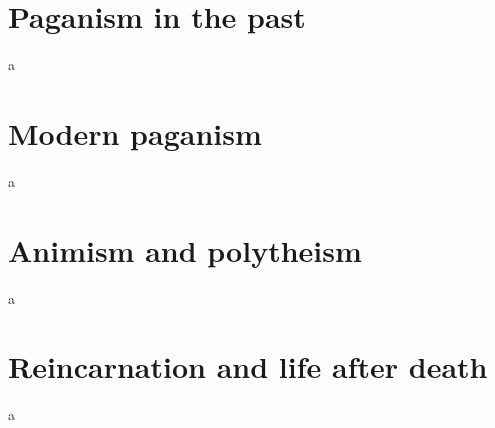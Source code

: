 \section{Paganism in the past}
a



\section{Modern paganism}
a




\section{Animism and polytheism}
a



\section{Reincarnation and life after death}
a


